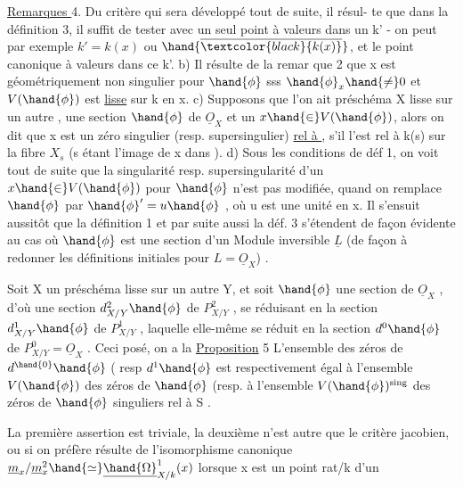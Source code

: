 
\uline{Remarques }4.  Du  critère qui sera développé tout de suite, il résul-%
te que dans la définition 3, il suffit de tester avec un seul point
à valeurs dans un k' - on peut par exemple  $k'=k(x)$ ou $\hand{\overline{\textcolor{black}{k(x)}}}$, et
le point canonique à valeurs dans ce k'. b) Il résulte de la remar
que 2 que x est géométriquement non singulier pour $\hand{\phi}$ sss $\hand{\phi}_x \hand{\neq} 0$ et
$V(\hand{\phi})$ est \uline{lisse} sur k en x. c) Supposons que l'on ait  préschéma X lisse
sur un autre , une section $\hand{\phi}$ de $\underline{O}_X$ et un $x \hand{\in} V(\hand{\phi})$, alors on dit que x
est un zéro singulier (resp. supersingulier) \uline{rel à }, s'il l'est
rel à k(s) sur la fibre $X_s$ (s étant l'image de x dans ). d) Sous
les conditions de déf 1, on voit tout de suite que la singularité resp.
\margin{$\|$} supersingularité d'un $x \hand{\in} V(\hand{\phi})$ pour $\hand{\phi}$ n'est pas modifiée, quand on
remplace $\hand{\phi}$ par $\hand{\phi}'=u\hand{\phi}$ , où u est une unité en x. Il s'ensuit aussitôt que
la  définition 1 et par suite aussi la déf. 3 s'étendent de façon
évidente au cas où $\hand{\phi}$ est une section d'un Module inversible $\underline{L}$ (de façon
à redonner les définitions initiales pour $L = \underline{O}_X$) .

 Soit X un préschéma lisse sur un
autre Y, et soit $\hand{\phi}$ une section de $\underline{O}_X$ , d'où une section $d^2_{X/Y}\hand{\phi}$ de
$P^2_{X/Y}$ , se réduisant en la section $d^1_{X/Y}\hand{\phi}$ de $P^1_{X/Y}$ , laquelle elle-même
se réduit en la section $d^0\hand{\phi}$ \inserted[typed]{$=\hand{\phi}$} de $P^0_{X/Y} = \underline{O}_X$ . Ceci posé, on a la
\uline{Proposition} 5 L'ensemble des zéros de $d^{\hand{0}}\hand{\phi}$ ( resp $d^1\hand{\phi}$ \hand{)} 
 est respectivement égal à l'ensemble $V(\hand{\phi})$ des zéros de $\hand{\phi}$ (resp. à
l'ensemble $V(\hand{\phi})^{\mathrm{sing}}$ des zéros de $\hand{\phi}$ singuliers rel à S\hand{)} 
.

La première assertion est triviale, la deuxième n'est autre
que le critère jacobien, ou si on préfère résulte de l'isomorphisme
canonique $\underline{m}_x/\underline{m}_x^2 \hand{\simeq} \underline{\hand{\Omega}}^1_{X/k}(x)$ lorsque x est un point rat/k d'un

